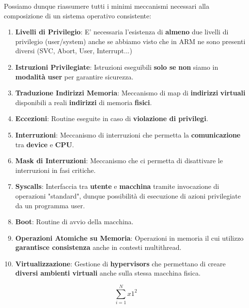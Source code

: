 \documentclass{article}
\begin{document}
Possiamo dunque riassumere tutti i minimi meccanismi necessari alla composizione di un sistema operativo consistente:

\begin{enumerate}
    \item \textbf{Livelli di Privilegio}: E' necessaria l'esistenza di \textbf{almeno} due livelli di privilegio (user/system) anche se abbiamo visto che in ARM ne sono presenti diversi (SVC, Abort, User, Interrupt...)
    \item \textbf{Istruzioni Privilegiate}: Istruzioni eseguibili \textbf{solo se} \textbf{non} siamo in \textbf{modalità user} per garantire sicurezza.
    \item \textbf{Traduzione Indirizzi Memoria}: Meccanismo di map di \textbf{indirizzi} \textbf{virtuali} disponibili a reali \textbf{indirizzi} di memoria \textbf{fisici}.
    \item \textbf{Eccezioni}: Routine eseguite in caso di \textbf{violazione di privilegi}.
    \item \textbf{Interruzioni}: Meccanismo di interruzioni che permetta la \textbf{comunicazione} tra \textbf{device} e \textbf{CPU}.
    \item \textbf{Mask di Interruzioni}: Meccanismo che ci permetta di disattivare le interruzioni in fasi critiche.
    \item \textbf{Syscalls}: Interfaccia tra \textbf{utente} e \textbf{macchina} tramite invocazione di operazioni "standard", dunque possibilità di esecuzione di azioni privilegiate da un programma user.
    \item \textbf{Boot}: Routine di avvio della macchina.
    \item \textbf{Operazioni Atomiche su Memoria}: Operazioni in memoria il cui utilizzo \textbf{garantisce consistenza} anche in contesti multithread.
    \item \textbf{Virtualizzazione}: Gestione di \textbf{hypervisors} che permettano di creare \textbf{diversi ambienti virtuali} anche sulla stessa macchina fisica. 
\end{enumerate}

\[ \sum^{N}_{i=1} x1^{2} \]



\newpage
\end{document}
